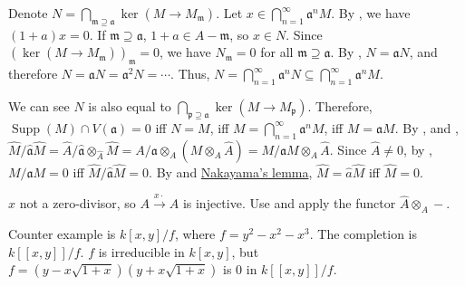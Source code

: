 \begin{exercise}\label{ex10.3}
	Denote $N=\bigcap_{\mathfrak{m}\supseteq\mathfrak{a}}\ker\left(M\rightarrow M_\mathfrak{m}\right)$. Let $x\in\bigcap_{n=1}^\infty\mathfrak{a}^nM$. By , we have $(1+a)x=0$. If $\mathfrak{m}\supseteq\mathfrak{a}$, $1+a\in A-\mathfrak{m}$, so $x\in N$. Since $\left(\ker\left(M\rightarrow M_\mathfrak{m}\right)\right)_\mathfrak{m}=0$, we have $N_\mathfrak{m}=0$ for all $\mathfrak{m}\supseteq\mathfrak{a}$. By , $N=\mathfrak{a}N$, and therefore $N=\mathfrak{a}N=\mathfrak{a}^2N=\cdots$. Thus, $N=\bigcap_{n=1}^\infty\mathfrak{a}^nN\subseteq\bigcap_{n=1}^\infty\mathfrak{a}^nM$.
	
	We can see $N$ is also equal to $\bigcap_{\mathfrak{p}\supseteq\mathfrak{a}}\ker\left(M\rightarrow M_\mathfrak{p}\right)$. Therefore, $\operatorname{Supp}(M)\cap V(\mathfrak{a})=0$ iff $N=M$, iff $M=\bigcap_{n=1}^\infty\mathfrak{a}^nM$, iff $M=\mathfrak{a}M$. By ,  and , $\hat{M}/\hat{\mathfrak{a}}\hat{M}=\hat{A}/\hat{\mathfrak{a}}\otimes_{\hat{A}}\hat{M}=A/\mathfrak{a}\otimes_A\left(M\otimes_A\hat{A}\right)=M/\mathfrak{a}M\otimes_A\hat{A}$. Since $\hat{A}\neq0$, by , $M/\mathfrak{a}M=0$ iff $\hat{M}/\hat{\mathfrak{a}}\hat{M}=0$. By  and \hyperref[2.6]{Nakayama's lemma}, $\hat{M}=\hat{a}\hat{M}$ iff $\hat{M}=0$.
\end{exercise}

\begin{exercise}\label{ex10.4}
	$x$ not a zero-divisor, so $A\xrightarrow{x\cdot}A$ is injective. Use  and apply the functor $\hat{A}\otimes_A-$.
	
	Counter example is $k[x,y]/f$, where $f=y^2-x^2-x^3$. The completion is $k[[x,y]]/f$. $f$ is irreducible in $k[x,y]$, but $f=\left(y-x\sqrt{1+x}\right)\left(y+x\sqrt{1+x}\right)$ is 0 in $k[[x,y]]/f$.
\end{exercise}

